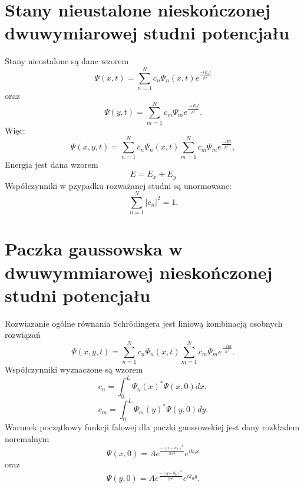 \documentclass[11pt,a4paper,oneside]{article}
\begin{document}
\section{Stany nieustalone nieskończonej dwuwymiarowej studni potencjału}
	Stany nieustalone są dane wzorem
	\begin{equation}
		\Psi (x, t) = \sum_{n=1}^{N} c_{n}\Psi_{n}(x, t)e^{\frac{-iE_{x}t}{\hbar ^{2}}}
	\end{equation}
	oraz
	\begin{equation}
		\Psi (y, t) = \sum_{m=1}^{N} c_{m}\Psi_{m} e^{\frac{-iE_{y}t}{\hbar ^{2}}}.
	\end{equation}
	Więc:
	\begin{equation}
		\Psi(x, y, t) = \sum_{n=1}^{N} c_{n}\Psi_{n}(x, t)\sum_{m=1}^{N} c_{m}\Psi_{m} e^{\frac{-iEt}{\hbar ^{2}}},
	\end{equation}
	Energia jest dana wzorem
	\begin{equation}
		E = E_{x}+E_{y}
	\end{equation}
	Współczynniki w pzypadku rozważanej studni są unormowane:
	\begin{equation}
		\sum_{n=1}^{N}|c_{n}|^{2} = 1.
	\end{equation}
\section{Paczka gaussowska w dwuwymmiarowej nieskończonej studni potencjału}
	Rozwiazanie ogólne równania Schrödingera jest liniową kombinacją osobnych rozwiązań
	\begin{equation}
		\Psi(x, y, t) = \sum_{n=1}^{N} c_{n}\Psi_{n}(x, t)\sum_{m=1}^{N} c_{m}\Psi_{m} e^{\frac{-iEt}{\hbar ^{2}}}.
	\end{equation}
	Współczynniki wyznaczone są wzorem
	\begin{equation}
		c_{n} = \int_{0}^{L}\Psi _{n}(x)^{*}\Psi (x,0)dx,
	\end{equation}
	\begin{equation}
		c_{m} = \int_{0}^{L}\Psi _{m}(y)^{*}\Psi (y,0)dy.
	\end{equation}	
	Warunek początkowy funkcji falowej dla paczki gaussowskiej jest dany rozkładem noremalnym
	\begin{equation}
		\Psi(x, 0) = Ae^{\frac{-(x-a_{0})^{2}}{2\sigma ^{2}}}e^{ik_{0}x}
	\end{equation}
	oraz
	\begin{equation}
		\Psi(y, 0) = Ae^{\frac{-(y-b_{0})^{2}}{2\sigma ^{2}}}e^{ik_{0}y}.
	\end{equation}	
\end{document}
